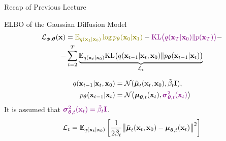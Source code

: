 \documentclass{beamer}
\begin{document}
\begin{frame}{Recap of Previous Lecture}
	\begin{block}{ELBO of the Gaussian Diffusion Model}
		\vspace{-0.7cm}
		\begin{multline*}
			\cL_{\bphi, \btheta}(\bx) =  {\color{olive}\bbE_{q(\bx_1 | \bx_0)} \log \pt(\bx_0 | \bx_1)} - {\color{violet}\KL\bigl(q(\bx_T | \bx_0) \| p(\bx_T)\bigr)} - \\
			- \sum_{t=2}^T  \underbrace{ \bbE_{q(\bx_t | \bx_0)}\KL \bigl(q(\bx_{t-1} | \bx_t, \bx_0) \| \pt(\bx_{t-1} | \bx_t)\bigr)}_{\cL_t}
		\end{multline*}
		\vspace{-1.0cm}
	\end{block}
	\begin{align*}
		q(\mathbf{x}_{t-1} | \mathbf{x}_t, \mathbf{x}_0) &= \mathcal{N}(\tilde{\boldsymbol{\mu}}_t(\mathbf{x}_t, \mathbf{x}_0), \tilde{\beta}_t \mathbf{I}), \\
		p_{\boldsymbol{\theta}}(\mathbf{x}_{t - 1} | \mathbf{x}_t) &= \mathcal{N} \bigl(\boldsymbol{\mu}_{\boldsymbol{\theta}, t}(\mathbf{x}_t), {\color{violet}\boldsymbol{\sigma}_{\boldsymbol{\theta}, t}^2(\mathbf{x}_t)}\bigr)
	\end{align*}
	It is assumed that ${\color{violet}\boldsymbol{\sigma}_{\boldsymbol{\theta}, t}^2(\mathbf{x}_t) = \tilde{\beta}_t \mathbf{I}}$.
	\[
		\mathcal{L}_t = \mathbb{E}_{q(\mathbf{x}_t | \mathbf{x}_0)} \left[\frac{1}{2\tilde{\beta}_t} \bigl\| \tilde{\boldsymbol{\mu}}_t(\mathbf{x}_t, \mathbf{x}_0) - \boldsymbol{\mu}_{\boldsymbol{\theta}, t}(\mathbf{x}_t) \bigr\|^2  \right]
	\]
\end{frame}
\end{document}

